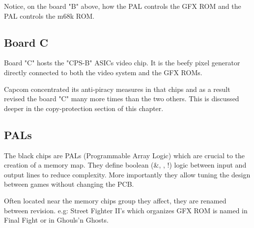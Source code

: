 


Notice, on the board "B" above, how the PAL  controls the GFX ROM and the PAL  controls the m68k ROM.



\subsection{Board C}
Board "C" hosts the "CPS-B" ASICs video chip. It is the beefy pixel generator directly connected to both the video system and the GFX ROMs.

Capcom concentrated its anti-piracy measures in that chips and as a result revised the board "C" many more times than the two others. This is discussed deeper in the copy-protection section of this chapter.


\begin{minipage}[t]{0.49\linewidth}
\end{minipage}%
\hfill%
\begin{minipage}[t]{0.49\linewidth}
\end{minipage}

\subsection{PALs}
The black chips are PALs (Programmable Array Logic) which are crucial to the creation of a memory map. They define boolean (\&, \textbar, !) logic between input and output lines to reduce complexity. More importantly they allow tuning the design between games without changing the PCB.


 Often located near the memory chips group they affect, they are renamed between revision. e.g: Street Fighter II's  which organizes GFX ROM is named  in Final Fight or  in Ghouls'n Ghosts.



